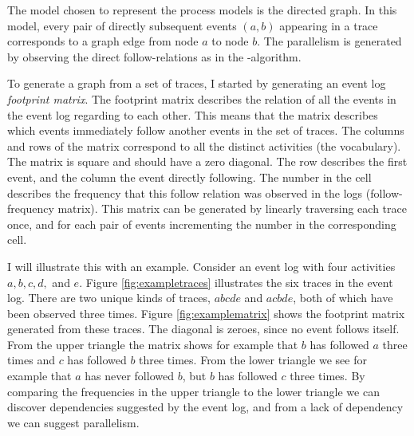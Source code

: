 \documentclass[english,12pt,a4paper,pdftex,sci,utf8]{aaltothesis}
\theoremstyle{definition}
\begin{document}
The model chosen to represent the process models is the directed graph. 
In this model, every pair of directly subsequent events $(a,b)$ appearing in a trace corresponds to a 
graph edge from node $a$ to node $b$.
The parallelism is generated by observing the direct follow-relations as in the \textalpha-algorithm.

To generate a graph from a set of traces, I started by generating an event log \emph{footprint matrix}.
The footprint matrix describes the relation of all the events in the event log regarding to each other.
This means that the matrix describes which events immediately follow another events in the set of traces.
The columns and rows of the matrix correspond to all the distinct activities (the vocabulary).
The matrix is square and should have a zero diagonal.
The row describes the first event, and the column the event directly following.
The number in the cell describes the frequency that this follow relation was observed in the logs (follow-frequency matrix).
This matrix can be generated by linearly traversing each trace once, and for each pair of events incrementing the number in the corresponding cell.

I will illustrate this with an example. Consider an event log with four activities $a,b,c,d,$ and $e$.
Figure \ref{fig:exampletraces} illustrates the six traces in the event log. There are two unique kinds of traces, $abcde$ and $acbde$, both of which have been observed three times. Figure \ref{fig:examplematrix} shows the footprint matrix generated from these traces.
The diagonal is zeroes, since no event follows itself.
From the upper triangle the matrix shows for example that $b$ has followed $a$ three times and $c$ has followed $b$ three times. From the lower triangle we see for example that $a$ has never followed $b$, but $b$ has followed $c$ three times.
By comparing the frequencies in the upper triangle to the lower triangle we can discover dependencies suggested by the event log, and from a lack of dependency we can suggest parallelism.
\end{document}
